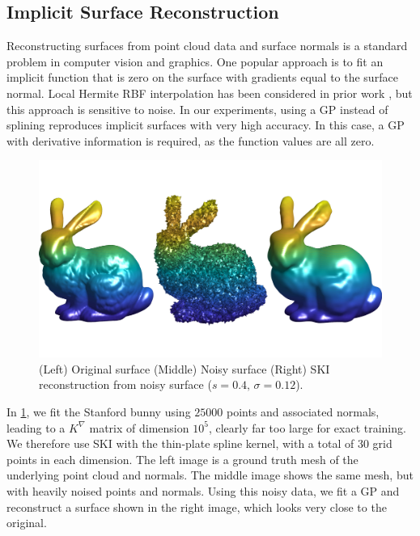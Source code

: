 \subsection{Implicit Surface Reconstruction}
Reconstructing surfaces from point cloud data and surface normals is a standard
problem in computer vision and graphics. One popular approach is to fit an
implicit function that is zero on the surface with gradients equal to the
surface normal. Local Hermite RBF interpolation has been considered
in prior work \cite{macedo2011hermite}, but this approach is sensitive to noise.
In our experiments, using a GP instead of splining reproduces implicit surfaces
with very high accuracy.  In this case, a GP with derivative information is
required, as the function values are all zero.

\begin{figure}[ht]
  \begin{center}
    \includegraphics[width=\textwidth]{./sgp/pics/bunny}
    \caption{(Left) Original surface (Middle) Noisy surface (Right) SKI
    reconstruction from noisy surface ($s=0.4,\,\sigma=0.12$).}\label{fig:bunny}
  \end{center}
\end{figure}

In \cref{fig:bunny}, we fit the Stanford bunny using $25000$ points and
associated normals, leading to a $K^{\nabla}$ matrix of dimension $10^5$,
clearly far too large for exact training. We therefore use SKI with the
thin\hyp{}plate spline kernel, with a total of 30 grid points in each dimension.
The left image is a ground truth mesh of the underlying point cloud and normals.
The middle image shows the same mesh, but with heavily noised points and
normals. Using this noisy data, we fit a GP and reconstruct a surface shown in
the right image, which looks very close to the original.

